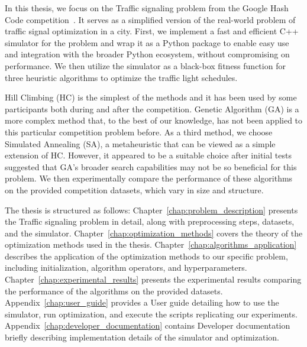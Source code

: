 In this thesis, we focus on the Traffic signaling problem from the Google Hash Code competition~\cite{google2023google}. It serves as a simplified version of the real-world problem of traffic signal optimization in a city. First, we implement a fast and efficient C++ simulator for the problem and wrap it as a Python package to enable easy use and integration with the broader Python ecosystem, without compromising on performance.
We then utilize the simulator as a black-box fitness function for three heuristic algorithms to optimize the traffic light schedules.

Hill Climbing (HC) is the simplest of the methods and it has been used by some participants both during and after the competition.
Genetic Algorithm (GA) is a more complex method that, to the best of our knowledge, has not been applied to this particular competition problem before.
As a third method, we choose Simulated Annealing (SA), a metaheuristic that can be viewed as a simple extension of HC. However, it appeared to be a suitable choice after initial tests suggested that GA's broader search capabilities may not be so beneficial for this problem.
We then experimentally compare the performance of these algorithms on the provided competition datasets, which vary in size and structure.

The thesis is structured as follows:
Chapter~\ref{chap:problem_description} presents the Traffic signaling problem in detail, along with preprocessing steps, datasets, and the simulator.
Chapter~\ref{chap:optimization_methods} covers the theory of the optimization methods used in the thesis.
Chapter~\ref{chap:algorithms_application} describes the application of the optimization methods to our specific problem, including initialization, algorithm operators, and hyperparameters.
Chapter~\ref{chap:experimental_results} presents the experimental results comparing the performance of the algorithms on the provided datasets.
Appendix~\ref{chap:user_guide} provides a User guide detailing how to use the simulator, run optimization, and execute the scripts replicating our experiments.
Appendix~\ref{chap:developer_documentation} contains Developer documentation briefly describing implementation details of the simulator and optimization.
